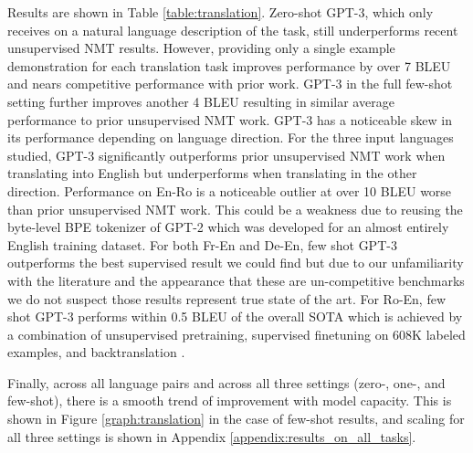 \documentclass{article}
\begin{document}
Results are shown in Table \ref{table:translation}. Zero-shot GPT-3, which only receives on a natural language description of the task, still underperforms recent unsupervised NMT results. However, providing only a single example demonstration for each translation task improves performance by over 7 BLEU and nears competitive performance with prior work. GPT-3 in the full few-shot setting further improves another 4 BLEU resulting in similar average performance to prior unsupervised NMT work. GPT-3 has a noticeable skew in its performance depending on language direction. For the three input languages studied, GPT-3 significantly outperforms prior unsupervised NMT work when translating into English but underperforms when translating in the other direction. Performance on En-Ro is a noticeable outlier at over 10 BLEU worse than prior unsupervised NMT work. This could be a weakness due to reusing the byte-level BPE tokenizer of GPT-2 which was developed for an almost entirely English training dataset. For both Fr-En and De-En, few shot GPT-3 outperforms the best supervised result we could find but due to our unfamiliarity with the literature and the appearance that these are un-competitive benchmarks we do not suspect those results represent true state of the art. For Ro-En, few shot GPT-3 performs within 0.5 BLEU of the overall SOTA which is achieved by a combination of unsupervised pretraining, supervised finetuning on 608K labeled examples, and backtranslation \cite{liu2019multi}.

Finally, across all language pairs and across all three settings (zero-, one-, and few-shot), there is a smooth trend of improvement with model capacity.  This is shown in Figure \ref{graph:translation} in the case of few-shot results, and scaling for all three settings is shown in Appendix \ref{appendix:results_on_all_tasks}.
\end{document}
